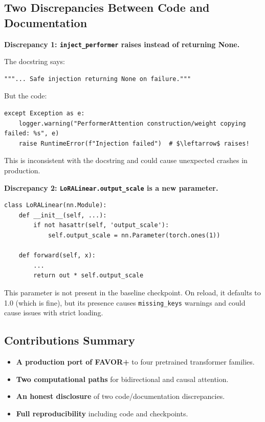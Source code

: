 \subsection{Two Discrepancies Between Code and Documentation}

\textbf{Discrepancy 1: \texttt{inject\_performer} raises instead of returning None.}

The docstring says:

\begin{lstlisting}
"""... Safe injection returning None on failure."""
\end{lstlisting}

But the code:

\begin{lstlisting}
except Exception as e:
    logger.warning("PerformerAttention construction/weight copying failed: %s", e)
    raise RuntimeError(f"Injection failed")  # $\leftarrow$ raises!
\end{lstlisting}

This is inconsistent with the docstring and could cause unexpected crashes 
in production.

\textbf{Discrepancy 2: \texttt{LoRALinear.output\_scale} is a new parameter.}

\begin{lstlisting}
class LoRALinear(nn.Module):
    def __init__(self, ...):
        if not hasattr(self, 'output_scale'):
            self.output_scale = nn.Parameter(torch.ones(1))
    
    def forward(self, x):
        ...
        return out * self.output_scale
\end{lstlisting}

This parameter is not present in the baseline checkpoint. On reload, it 
defaults to 1.0 (which is fine), but its presence causes \texttt{missing\_keys} 
warnings and could cause issues with strict loading.

\subsection{Contributions Summary}

\begin{itemize}
\item \textbf{A production port of FAVOR+} to four pretrained transformer families.
\item \textbf{Two computational paths} for bidirectional and causal attention.
\item \textbf{An honest disclosure} of two code/documentation discrepancies.
\item \textbf{Full reproducibility} including code and checkpoints.

\end{itemize}
